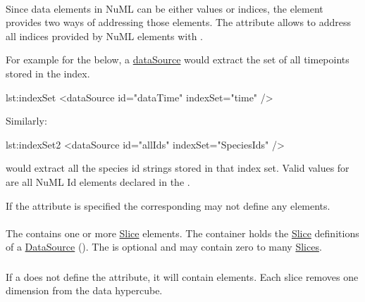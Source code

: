 \paragraph*{}
\label{sec:indexSet}
Since data elements in NuML can be either values or indices, the \SedDataSource element provides two ways of addressing those elements. The  attribute allows to address all indices provided by NuML elements with . 

For example for the   below, a \hyperref[class:dataSource]{dataSource} would extract the set of all timepoints stored in the index.

\begin{myXmlLst}{}{lst:indexSet}
<dataSource id="dataTime" indexSet="time" />
\end{myXmlLst} 

Similarly: 

\begin{myXmlLst}{}{lst:indexSet2}
<dataSource id="allIds" indexSet="SpeciesIds" />
\end{myXmlLst} 

would extract all the species id strings stored in that index set. Valid values for  are all NuML Id elements declared in the . 

If the  attribute is specified the corresponding  may not define any  elements.


\paragraph*{}
\label{sec:listOfSlices}
The  contains one or more \hyperref[class:slice]{Slice} elements.
The  container holds the \hyperref[class:slice]{Slice} definitions of a \hyperref[class:dataSource]{DataSource} (). The  is optional and may contain zero to many \hyperref[class:slice]{Slices}.


\subsubsection{}
\label{class:slice}
If a \SedDataSource does not define the \hyperref[sec:indexSet]{} attribute, it will contain  elements. Each slice removes one dimension from the data hypercube.

